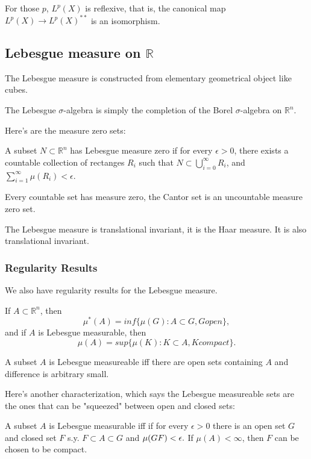 \documentclass[main.tex]{subfiles}
\begin{document}
\begin{corollary}
For those $p$, $L^p(X)$ is reflexive, that is, the canonical map $L^p(X) \rightarrow L^p(X)^{**}$ is an isomorphism.
\end{corollary}


\subsection{Lebesgue measure on $\mathbb{R}$}

The Lebesgue measure is constructed from elementary geometrical object like cubes.

The Lebesgue $\sigma$-algebra is simply the completion of the Borel $\sigma$-algebra on $\mathbb{R}^n$.

Here's are the measure zero sets:
\begin{lemma}
A subset $N \subset \mathbb{R}^n$ has Lebesgue measure zero if for every $\epsilon > 0$, there exists a countable collection of rectanges $R_i$ such that $N \subset \bigcup_{i = 0}^\infty R_i$, and $\sum_{i = 1} ^\infty \mu(R_i) < \epsilon$.
\end{lemma}

Every countable set has measure zero, the Cantor set is an uncountable measure zero set.

The Lebesgue measure is translational invariant, it is the Haar measure. It is also translational invariant. 


\subsubsection{Regularity Results}
We also have regularity results for the Lebesgue measure. 

\begin{theorem}
If $A \subset \mathbb{R}^n$, then 
$$
\mu^*(A) = inf\{\mu(G): A \subset G, G open\},
$$
and if $A$ is Lebesgue measurable, then 
$$
\mu(A) = sup \{\mu(K): K \subset A, K compact\}.
$$
\end{theorem}

A subset $A$ is Lebesgue measureable iff there are open sets containing $A$ and difference is arbitrary small.

Here's another characterization, which says the Lebesgue measureable sets are the ones that can be "squeezed" between open and closed sets:

\begin{theorem}
A subset $A$ is Lebesgue measurable iff if for every $\epsilon > 0$ there is an open set $G$ and closed set $F$ s.y. $F \subset A \subset G$ and $\mu(G\\F)< \epsilon.$ If $\mu(A) < \infty$, then $F$ can be chosen to be compact.
\end{theorem}
\end{document}
